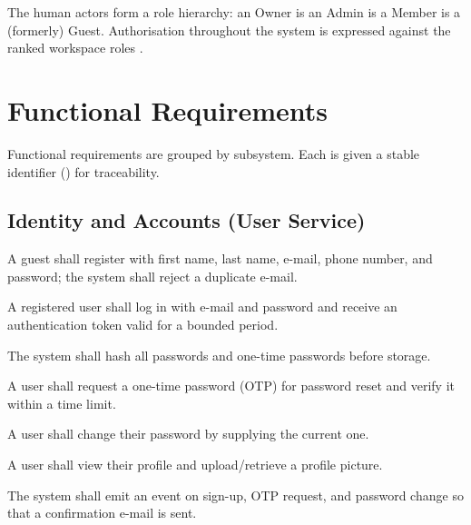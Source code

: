 The human actors form a role hierarchy: an Owner is an Admin is a Member is a
(formerly) Guest. Authorisation throughout the system is expressed against the
ranked workspace roles .

\section{Functional Requirements}
\label{sec:fr}

Functional requirements are grouped by subsystem. Each is given a stable
identifier () for traceability.

\subsection{Identity and Accounts (User Service)}
\begin{description}[leftmargin=1.6cm,style=nextline]
  \item[FR-01] A guest shall register with first name, last name, e-mail,
  phone number, and password; the system shall reject a duplicate e-mail.
  \item[FR-02] A registered user shall log in with e-mail and password and
  receive an authentication token valid for a bounded period.
  \item[FR-03] The system shall hash all passwords and one-time passwords before
  storage.
  \item[FR-04] A user shall request a one-time password (OTP) for password reset
  and verify it within a time limit.
  \item[FR-05] A user shall change their password by supplying the current one.
  \item[FR-06] A user shall view their profile and upload/retrieve a profile
  picture.
  \item[FR-07] The system shall emit an event on sign-up, OTP request, and
  password change so that a confirmation e-mail is sent.
\end{description}

